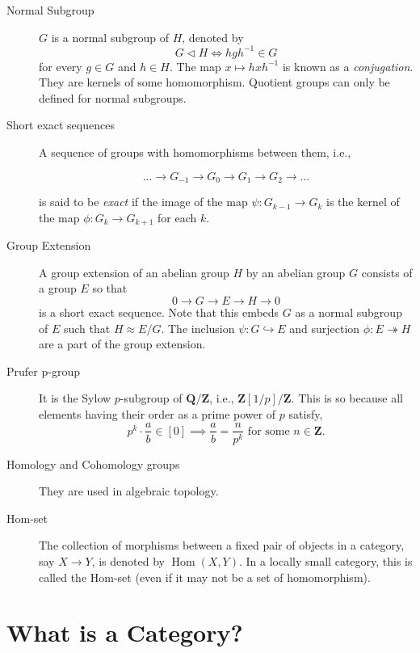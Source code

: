 \documentclass{scrbook}
\theoremstyle{definition}\newtheorem{defn}{Definition}
\theoremstyle{definition}\newtheorem*{rmk}{Remark}
\newcommand{\Z}{\mathbf{Z}}
\newcommand{\Q}{\mathbf{Q}}
\DeclareMathOperator{\Hom}{Hom}
\begin{document}
\begin{description}
  \item[Normal Subgroup] $G$ is a normal subgroup of $H$, denoted by 
    \[G \triangleleft H \iff hgh^{-1} \in G\] 
    for every $g \in G$ and $h
    \in H$. The map $x \mapsto hxh^{-1}$ is known as a \emph{conjugation}. They
    are kernels of some homomorphism. Quotient groups can only be defined for
    normal subgroups.

  \item[Short exact sequences]  A sequence of groups with homomorphisms
    between them, i.e., 

    \[ \dots \to G_{-1} \to G_{0} \to G_{1} \to G_{2} \to \dots \]

    is said to be \emph{exact} if the image of the map $\psi: G_{k-1} \to G_k$ 
    is the kernel of the map $\phi: G_k \to G_{k+1}$ for each $k$.

  \item[Group Extension] A group extension of an abelian group $H$ by an abelian
    group $G$ consists of a group $E$ so that 
    \[ 0 \to G \to E \to H \to 0 \]
    is a short exact sequence. Note that this embeds $G$ as a normal subgroup of
    $E$ such that $H \approx E/G$. The inclusion $\psi: G \hookrightarrow E$ and 
    surjection $\phi: E \twoheadrightarrow H$ are a part of the group extension.

  \item[Prufer p-group] It is the Sylow $p$-subgroup of $\Q/\Z$, i.e.,
    $\Z[1/p]/\Z$. This is so because all elements having their order as a prime
    power of $p$ satisfy,
    \[p^k \cdot \frac ab \in [0] \implies \frac ab = \frac n{p^k} \text{ for
    some } n \in \Z.\]

  \item[Homology and Cohomology groups] They are used in algebraic topology.

  \item[Hom-set] The collection of morphisms between a fixed
    pair of objects in a category, say $X \to Y$, is denoted by $\Hom(X, Y)$.
    In a locally small category, this is called the Hom-set (even if it may not
    be a set of homomorphism).
\end{description}

\newpage

\section{What is a Category?}
\end{document}
